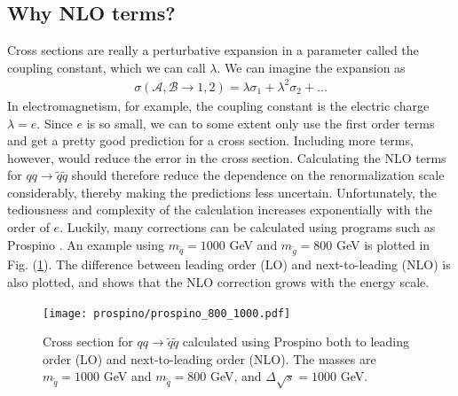 \documentclass[11pt]{article}
\begin{document}
\subsection*{Why NLO terms?}
\begin{flushleft}
Cross sections are really a perturbative expansion in a parameter called the coupling constant, which we can call $\lambda$. We can imagine the expansion as 
\begin{align*}
\sigma(\mathcal{A}, \mathcal{B} \rightarrow 1,2) = \lambda \sigma_1 + \lambda^2 \sigma_2 +...
\end{align*}
In electromagnetism, for example, the coupling constant is the electric charge $\lambda=e$.
Since $e$ is so small, we can to some extent only use the first order terms and get a pretty good prediction for a cross section. Including more terms, however, would reduce the error in the cross section. Calculating the NLO terms for $q q \rightarrow \tilde{q} \tilde{q}$ should therefore reduce the dependence on the renormalization scale considerably, thereby making the predictions less uncertain. Unfortunately, the tediousness and complexity of the calculation increases exponentially with the order of $e$. Luckily, many corrections can be calculated using programs such as Prospino \cite{beenakker1996prospino}. An example using $m_{\tilde{q}}=1000$ GeV and $m_{\tilde{g}}=800$ GeV is plotted in Fig. (\ref{fig:: prospino example}). The difference between leading order (LO) and next-to-leading (NLO) is also plotted, and shows that the NLO correction grows with the energy scale.

\end{flushleft}
\begin{figure}[H]
\centering
\texttt{[image: prospino/prospino\_800\_1000.pdf]}
\caption{Cross section for $qq \rightarrow \tilde{q} \tilde{q}$ calculated using Prospino \cite{beenakker1996prospino} both to leading order (LO) and next-to-leading order (NLO). The masses are $m_{\tilde{q}}=1000$ GeV and $m_{\tilde{q}}=800$ GeV, and $\Delta \sqrt{s}=1000$ GeV.}
\label{fig:: prospino example}
\end{figure}
\end{document}
